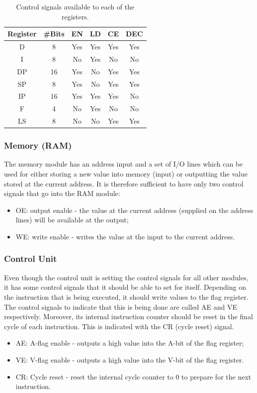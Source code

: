 \begin{table}[H]
  \centering
  \begin{tabular}{c|c|c|c|c|c}
    Register & \#Bits & EN  & LD  & CE  & DEC \\ \hline 
    D        & 8     & Yes & Yes & Yes & Yes \\
    I        & 8     & No  & Yes & No  & No  \\
    DP       & 16    & Yes & No  & Yes & Yes \\ 
    SP       & 8     & Yes & No  & Yes & Yes \\ 
    IP       & 16    & Yes & Yes & Yes & No  \\ 
    F        & 4     & No  & Yes & No  & No  \\ 
    LS       & 8     & No  & No  & Yes & Yes \\ 
  \end{tabular}
  \caption{Control signals available to each of the registers.}
  \label{tab:registers}
\end{table}

\subsubsection{Memory (RAM)}
The memory module has an address input and a set of I/O lines which can be used for either storing a new value into memory (input) or outputting the value stored at the current address. It is therefore sufficient to have only two control signals that go into the RAM module:
\begin{itemize}
\item OE: output enable - the value at the current address (supplied on the address lines) will be available at the output;
\item WE: write enable - writes the value at the input to the current address.
\end{itemize}

\subsubsection{Control Unit}
Even though the control unit is setting the control signals for all other modules, it has some control signals that it should be able to set for itself. Depending on the instruction that is being executed, it should write values to the flag register. The control signals to indicate that this is being done are called AE and VE respectively. Moreover, its internal instruction counter should be reset in the final cycle of each instruction. This is indicated with the CR (cycle reset) signal.
\begin{itemize}
\item AE: A-flag enable - outputs a high value into the A-bit of the flag register;
\item VE: V-flag enable - outputs a high value into the V-bit of the flag register.
\item CR: Cycle reset - reset the internal cycle counter to 0 to prepare for the next instruction.
\end{itemize}

